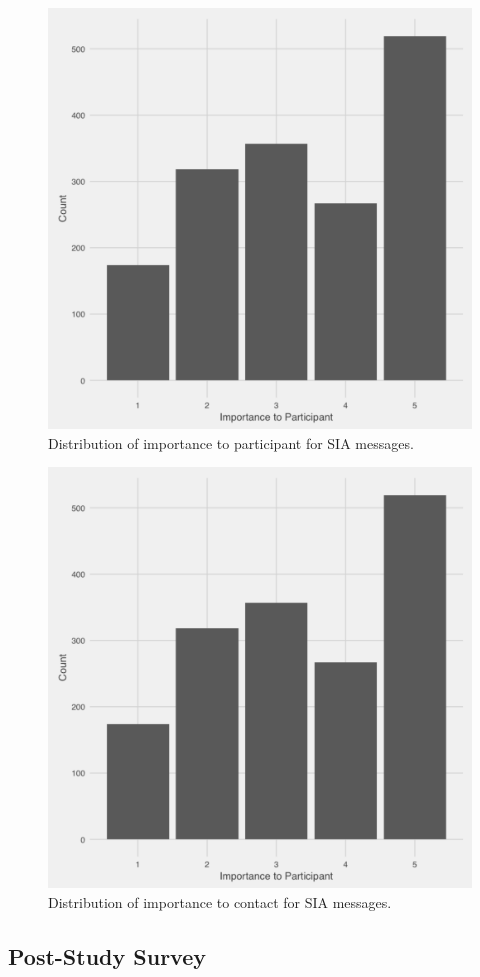 \documentclass[12pt]{nuthesis}	%
\begin{document}
\begin{figure}[h]
\centering
\includegraphics[width=.7\textwidth]{figures/importance_distribution}
\caption{Distribution of importance to participant for SIA messages.}
\label{fig:importance_distribution}
\end{figure}

\begin{figure}[h]
\centering
\includegraphics[width=.7\textwidth]{figures/importance_distribution}
\caption{Distribution of importance to contact for SIA messages.}
\label{fig:importance_contact_distribution}
\end{figure}


\subsection{Post-Study Survey}
\end{document}

